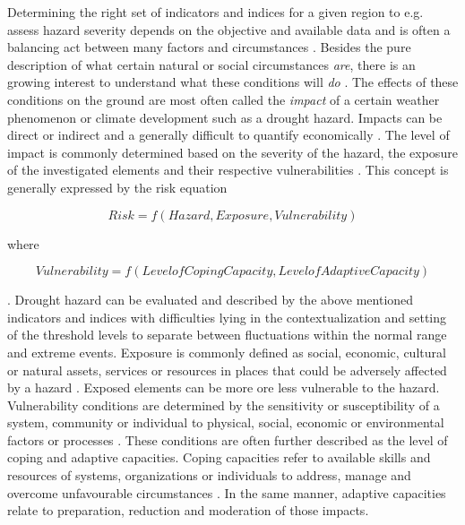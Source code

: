 Determining the right set of indicators and indices for a given region to e.g. assess hazard severity depends on the objective and available data and is often a balancing act between many factors and circumstances \autocite{svobodaHandbookDroughtIndicators2016}. Besides the pure description of what certain natural or social circumstances \textit{are}, there is an growing interest to understand what these conditions will \textit{do} \autocite{boultDroughtImpactbasedForecasting2022, lackstromBackyardHydroclimatologyCitizen2022}.
The effects of these conditions on the ground are most often called the \textit{impact} of a certain weather phenomenon or climate development such as a drought hazard. Impacts can be direct or indirect and a generally difficult to quantify economically \autocite{vereintenationenSpecialReportDrought2021}. The level of impact is commonly determined based on the severity of the hazard, the exposure of the investigated elements and their respective vulnerabilities \autocite{harrowsmithFutureForecastImpact2020,svobodaHandbookDroughtIndicators2016,vereintenationenSpecialReportDrought2021}.
This concept is generally expressed by the risk equation

        \[Risk = f(Hazard, Exposure, Vulnerability)\]

    where

        \[Vulnerability = f(Level of Coping Capacity, Level of Adaptive Capacity)\]

\autocite{boultDroughtImpactbasedForecasting2022,harrowsmithFutureForecastImpact2020,vereintenationenSpecialReportDrought2021}. Drought hazard can be evaluated and described by the above mentioned indicators and indices with difficulties lying in the contextualization and setting of the threshold levels to separate between fluctuations within the normal range and extreme events. Exposure is commonly defined as social, economic, cultural or natural assets, services or resources in places that could be adversely affected by a hazard \autocite{ipccClimateChange20142014}. Exposed elements can be more ore less vulnerable to the hazard. Vulnerability conditions are determined by the sensitivity or susceptibility of a system, community or individual to physical, social, economic or environmental factors or processes \autocite{ipccClimateChange20142014}. These conditions are often further described as the level of coping and adaptive capacities. Coping capacities refer to available skills and resources of systems, organizations or individuals to address, manage and overcome unfavourable circumstances \autocite{ipccGlossaryTerms2012}. In the same manner, adaptive capacities relate to preparation, reduction and moderation of those impacts.


